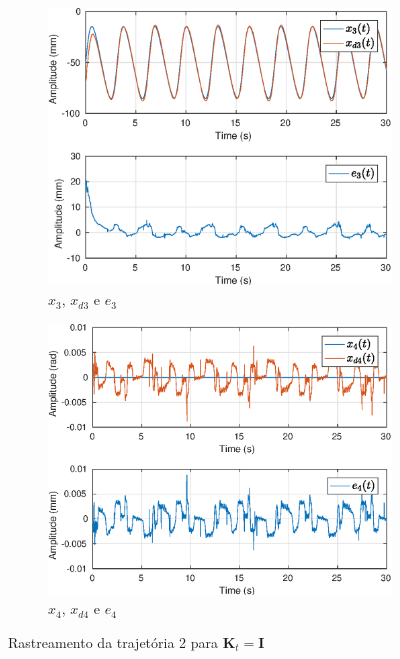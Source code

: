 \begin{figure}[H]
\begin{subfigure}{.5\textwidth}
  \centering
  \includegraphics[width=\linewidth]{./img/traj_2_k1/x3.eps}
  \caption{$x_3$, $x_{d3}$ e $e_3$}
  \label{fig:sub1}
\end{subfigure}%
\begin{subfigure}{.5\textwidth}
  \centering
  \includegraphics[width=\linewidth]{./img/traj_2_k1/x4.eps}
  \caption{$x_4$, $x_{d4}$ e $e_4$}
  \label{fig:sub2}
\end{subfigure}
\caption{Rastreamento da trajetória 2 para $\bm{K}_t = \bm{I}$}
\label{fig:test}
\end{figure}

